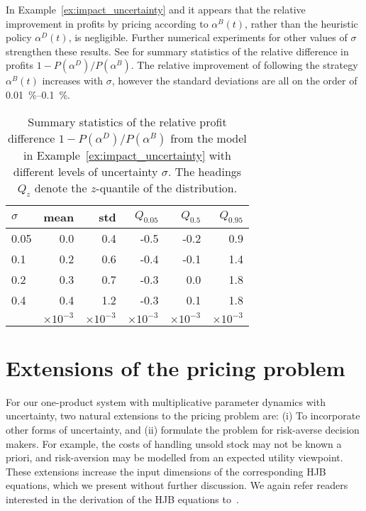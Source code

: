 \documentclass[main.tex]{subfiles}
\begin{document}
In Example~\ref{ex:impact_uncertainty} and
 it appears that the relative
improvement in profits by pricing according to $\alpha^B(t)$, rather than the heuristic
policy $\alpha^D(t)$, is negligible.
Further numerical experiments for other values of $\sigma$ strengthen
these results. See  for summary
statistics of the relative difference in profits
$1-P(\alpha^D)/P(\alpha^B)$.
The relative improvement of following the strategy $\alpha^B(t)$
increases with $\sigma$, however the standard deviations are all on
the order of \SIrange{0.01}{0.1}{\percent}.
\begin{table}[htb]
  \centering
  \begin{tabular}{lrrrrr}
    \toprule
    $\sigma$ & mean & std & $Q_{0.05}$ & $Q_{0.5}$ & $Q_{0.95}$\\
    \midrule
    0.05& 0.0 & 0.4 &-0.5&-0.2&0.9\\
    0.1&0.2& 0.6&-0.4&-0.1&1.4\\
    0.2&0.3& 0.7&-0.3&0.0&1.8\\
    0.4&0.4& 1.2&-0.3&0.1&1.8\\
    \midrule
             & $\times 10^{-3}$&$\times 10^{-3}$&$\times 10^{-3}$&$\times 10^{-3}$&$\times 10^{-3}$\\
    \bottomrule
  \end{tabular}
  \caption{Summary statistics of the relative profit difference
    $1-P(\alpha^D)/P(\alpha^B)$ from the model in
    Example~\ref{ex:impact_uncertainty} with different levels of
    uncertainty $\sigma$.
    The headings $Q_z$ denote the $z$-quantile of the distribution.
  }\label{tbl:profit_hjb_cec_statistics}
\end{table}

\section{Extensions of the pricing problem}\label{sec:extensions}
For our one-product system with multiplicative parameter dynamics with uncertainty,
two natural extensions to the pricing problem are: (i) To incorporate
other forms of uncertainty, and (ii) formulate the problem for risk-averse
decision makers. For example, the costs of handling unsold stock may
not be known a priori, and risk-aversion may be modelled from an
expected utility viewpoint.
These extensions increase the input dimensions of the corresponding
HJB equations, which we present without further discussion. We again
refer readers interested in the
derivation of the HJB equations to~\cite{pham2009continuous}.
\end{document}

